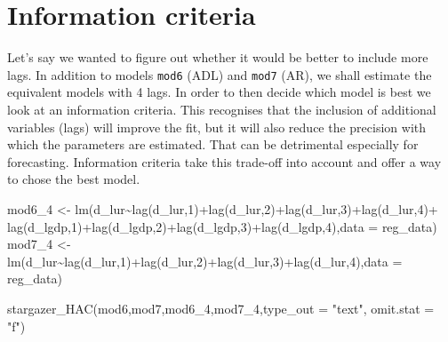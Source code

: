 \documentclass[
]{article}
\newenvironment{Shaded}{\begin{snugshade}}{\end{snugshade}}
\newcommand{\AttributeTok}[1]{\textcolor[rgb]{0.77,0.63,0.00}{#1}}
\newcommand{\DecValTok}[1]{\textcolor[rgb]{0.00,0.00,0.81}{#1}}
\newcommand{\FunctionTok}[1]{\textcolor[rgb]{0.00,0.00,0.00}{#1}}
\newcommand{\NormalTok}[1]{#1}
\newcommand{\OtherTok}[1]{\textcolor[rgb]{0.56,0.35,0.01}{#1}}
\newcommand{\SpecialCharTok}[1]{\textcolor[rgb]{0.00,0.00,0.00}{#1}}
\newcommand{\StringTok}[1]{\textcolor[rgb]{0.31,0.60,0.02}{#1}}
\begin{document}
\hypertarget{information-criteria}{%
\section{Information criteria}\label{information-criteria}}

Let's say we wanted to figure out whether it would be better to include
more lags. In addition to models \texttt{mod6} (ADL) and \texttt{mod7}
(AR), we shall estimate the equivalent models with 4 lags. In order to
then decide which model is best we look at an information criteria. This
recognises that the inclusion of additional variables (lags) will
improve the fit, but it will also reduce the precision with which the
parameters are estimated. That can be detrimental especially for
forecasting. Information criteria take this trade-off into account and
offer a way to chose the best model.

\begin{Shaded}
\begin{Highlighting}[]
\NormalTok{mod6\_4 }\OtherTok{\textless{}{-}} \FunctionTok{lm}\NormalTok{(d\_lur}\SpecialCharTok{\textasciitilde{}}\FunctionTok{lag}\NormalTok{(d\_lur,}\DecValTok{1}\NormalTok{)}\SpecialCharTok{+}\FunctionTok{lag}\NormalTok{(d\_lur,}\DecValTok{2}\NormalTok{)}\SpecialCharTok{+}\FunctionTok{lag}\NormalTok{(d\_lur,}\DecValTok{3}\NormalTok{)}\SpecialCharTok{+}\FunctionTok{lag}\NormalTok{(d\_lur,}\DecValTok{4}\NormalTok{)}\SpecialCharTok{+}
               \FunctionTok{lag}\NormalTok{(d\_lgdp,}\DecValTok{1}\NormalTok{)}\SpecialCharTok{+}\FunctionTok{lag}\NormalTok{(d\_lgdp,}\DecValTok{2}\NormalTok{)}\SpecialCharTok{+}\FunctionTok{lag}\NormalTok{(d\_lgdp,}\DecValTok{3}\NormalTok{)}\SpecialCharTok{+}\FunctionTok{lag}\NormalTok{(d\_lgdp,}\DecValTok{4}\NormalTok{),}\AttributeTok{data =}\NormalTok{ reg\_data)}
\NormalTok{mod7\_4 }\OtherTok{\textless{}{-}} \FunctionTok{lm}\NormalTok{(d\_lur}\SpecialCharTok{\textasciitilde{}}\FunctionTok{lag}\NormalTok{(d\_lur,}\DecValTok{1}\NormalTok{)}\SpecialCharTok{+}\FunctionTok{lag}\NormalTok{(d\_lur,}\DecValTok{2}\NormalTok{)}\SpecialCharTok{+}\FunctionTok{lag}\NormalTok{(d\_lur,}\DecValTok{3}\NormalTok{)}\SpecialCharTok{+}\FunctionTok{lag}\NormalTok{(d\_lur,}\DecValTok{4}\NormalTok{),}\AttributeTok{data =}\NormalTok{ reg\_data)}

\FunctionTok{stargazer\_HAC}\NormalTok{(mod6,mod7,mod6\_4,mod7\_4,}\AttributeTok{type\_out =} \StringTok{"text"}\NormalTok{, }\AttributeTok{omit.stat =} \StringTok{"f"}\NormalTok{)}
\end{Highlighting}
\end{Shaded}
\end{document}

